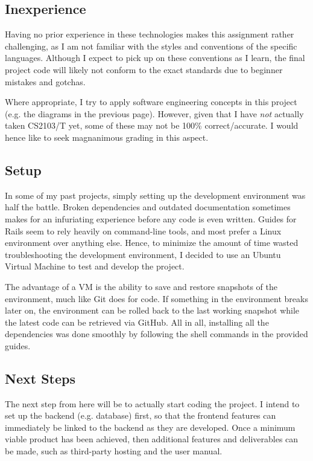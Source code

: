 \documentclass[12pt]{article}
\begin{document}
		\subsection{Inexperience}
Having no prior experience in these technologies makes this assignment rather challenging, as I am not familiar with the styles and conventions of the specific languages. Although I expect to pick up on these conventions as I learn, the final project code will likely not conform to the exact standards due to beginner mistakes and gotchas. 

Where appropriate, I try to apply software engineering concepts in this project (e.g. the diagrams in the previous page). However, given that I have \textit{not} actually taken CS2103/T yet, some of these may not be 100\% correct/accurate. I would hence like to seek magnanimous grading in this aspect.
		\subsection{Setup}
In some of my past projects, simply setting up the development environment was half the battle. Broken dependencies and outdated documentation sometimes makes for an infuriating experience before any code is even written. Guides for Rails seem to rely heavily on command-line tools, and most prefer a Linux environment over anything else. Hence, to minimize the amount of time wasted troubleshooting the development environment, I decided to use an Ubuntu Virtual Machine to test and develop the project.

The advantage of a VM is the ability to save and restore snapshots of the environment, much like Git does for code. If something in the environment breaks later on, the environment can be rolled back to the last working snapshot while the latest code can be retrieved via GitHub. All in all, installing all the dependencies was done smoothly by following the shell commands in the provided guides.
		\subsection{Next Steps}
The next step from here will be to actually start coding the project. I intend to set up the backend (e.g. database) first, so that the frontend features can immediately be linked to the backend as they are developed. Once a minimum viable product has been achieved, then additional features and deliverables can be made, such as third-party hosting and the user manual.
\end{document}
